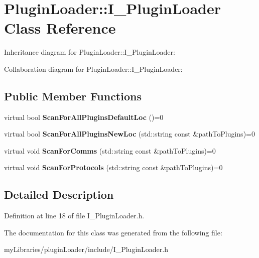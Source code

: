\hypertarget{classPluginLoader_1_1I__PluginLoader}{}\section{Plugin\+Loader\+::I\+\_\+\+Plugin\+Loader Class Reference}
\label{classPluginLoader_1_1I__PluginLoader}


Inheritance diagram for Plugin\+Loader\+::I\+\_\+\+Plugin\+Loader\+:


Collaboration diagram for Plugin\+Loader\+::I\+\_\+\+Plugin\+Loader\+:
\subsection*{Public Member Functions}
\begin{DoxyCompactItemize}
\item 
\mbox{\label{classPluginLoader_1_1I__PluginLoader_acba9f4614187a47b2cc2e91355821778}} 
virtual bool {\bfseries Scan\+For\+All\+Plugins\+Default\+Loc} ()=0
\item 
\mbox{\label{classPluginLoader_1_1I__PluginLoader_ab63da9b923b0b0e819818031092f99db}} 
virtual bool {\bfseries Scan\+For\+All\+Plugins\+New\+Loc} (std\+::string const \&path\+To\+Plugins)=0
\item 
\mbox{\label{classPluginLoader_1_1I__PluginLoader_af7e349b82ea3eec5a15413679a563dea}} 
virtual void {\bfseries Scan\+For\+Comms} (std\+::string const \&path\+To\+Plugins)=0
\item 
\mbox{\label{classPluginLoader_1_1I__PluginLoader_a0115aa68bab2c06e58af436c82f16c7f}} 
virtual void {\bfseries Scan\+For\+Protocols} (std\+::string const \&path\+To\+Plugins)=0
\end{DoxyCompactItemize}


\subsection{Detailed Description}


Definition at line 18 of file I\+\_\+\+Plugin\+Loader.\+h.



The documentation for this class was generated from the following file\+:\begin{DoxyCompactItemize}
\item 
my\+Libraries/plugin\+Loader/include/I\+\_\+\+Plugin\+Loader.\+h\end{DoxyCompactItemize}
